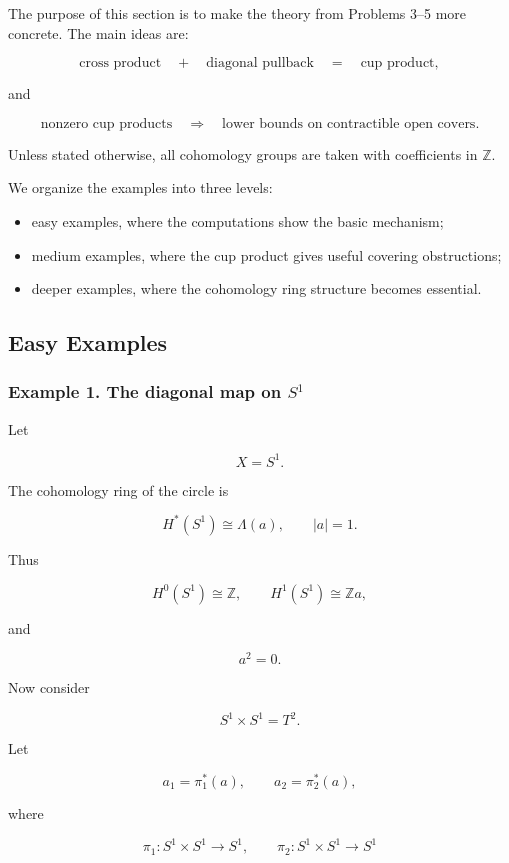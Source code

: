 \documentclass[12pt,a4paper]{article}
\theoremstyle{notespace}
\begin{document}
The purpose of this section is to make the theory from Problems 3--5 more concrete. The main ideas are:

\[
\text{cross product}
\quad+\quad
\text{diagonal pullback}
\quad=\quad
\text{cup product},
\]

and

\[
\text{nonzero cup products}
\quad\Longrightarrow\quad
\text{lower bounds on contractible open covers}.
\]

Unless stated otherwise, all cohomology groups are taken with coefficients in \(\mathbb Z\).

We organize the examples into three levels:

\begin{itemize}
	\item easy examples, where the computations show the basic mechanism;
	\item medium examples, where the cup product gives useful covering obstructions;
	\item deeper examples, where the cohomology ring structure becomes essential.
\end{itemize}

\subsection{Easy Examples}

\subsubsection{Example 1. The diagonal map on \(S^1\)}

Let

\[
X=S^1.
\]

The cohomology ring of the circle is

\[
H^*(S^1)\cong \Lambda(a),
\qquad
|a|=1.
\]

Thus

\[
H^0(S^1)\cong \mathbb Z,
\qquad
H^1(S^1)\cong \mathbb Z a,
\]

and

\[
a^2=0.
\]

Now consider

\[
S^1\times S^1=T^2.
\]

Let

\[
a_1=\pi_1^*(a),
\qquad
a_2=\pi_2^*(a),
\]

where

\[
\pi_1:S^1\times S^1\to S^1,
\qquad
\pi_2:S^1\times S^1\to S^1
\]
\end{document}
